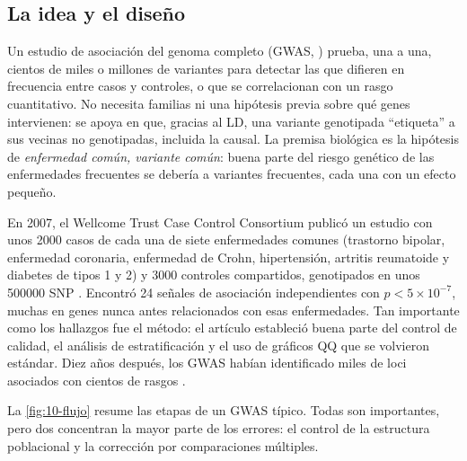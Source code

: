 \subsection{La idea y el diseño}

Un estudio de asociación del genoma completo (GWAS, ) prueba, una a una, cientos de miles o millones de variantes para detectar las que difieren en frecuencia entre casos y controles, o que se correlacionan con un rasgo cuantitativo. No necesita familias ni una hipótesis previa sobre qué genes intervienen: se apoya en que, gracias al LD, una variante genotipada ``etiqueta'' a sus vecinas no genotipadas, incluida la causal. La premisa biológica es la hipótesis de \emph{enfermedad común, variante común}: buena parte del riesgo genético de las enfermedades frecuentes se debería a variantes frecuentes, cada una con un efecto pequeño.

\begin{historia}
En 2007, el Wellcome Trust Case Control Consortium publicó un estudio con unos \num{2000} casos de cada una de siete enfermedades comunes (trastorno bipolar, enfermedad coronaria, enfermedad de Crohn, hipertensión, artritis reumatoide y diabetes de tipos 1 y 2) y \num{3000} controles compartidos, genotipados en unos \num{500000} SNP \parencite{c10-wtccc2007}. Encontró 24 señales de asociación independientes con $p<5\times10^{-7}$, muchas en genes nunca antes relacionados con esas enfermedades. Tan importante como los hallazgos fue el método: el artículo estableció buena parte del control de calidad, el análisis de estratificación y el uso de gráficos QQ que se volvieron estándar. Diez años después, los GWAS habían identificado miles de loci asociados con cientos de rasgos \parencite{c10-visscher2017}.
\end{historia}

La \cref{fig:10-flujo} resume las etapas de un GWAS típico. Todas son importantes, pero dos concentran la mayor parte de los errores: el control de la estructura poblacional y la corrección por comparaciones múltiples.

